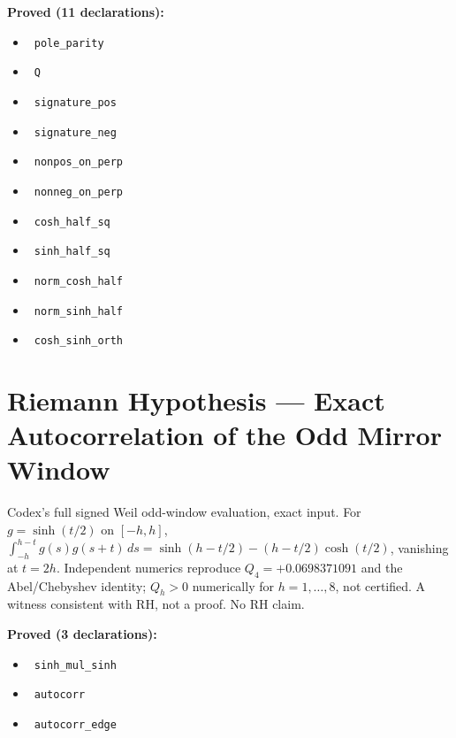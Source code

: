 \documentclass{report}
\theoremstyle{definition}
\begin{document}
\noindent\textbf{Proved (11 declarations):}
\begin{itemize}
  \item {}\leanok\ \texttt{pole\_parity}
  \item {}\leanok\ \texttt{Q}
  \item {}\leanok\ \texttt{signature\_pos}
  \item {}\leanok\ \texttt{signature\_neg}
  \item {}\leanok\ \texttt{nonpos\_on\_perp}
  \item {}\leanok\ \texttt{nonneg\_on\_perp}
  \item {}\leanok\ \texttt{cosh\_half\_sq}
  \item {}\leanok\ \texttt{sinh\_half\_sq}
  \item {}\leanok\ \texttt{norm\_cosh\_half}
  \item {}\leanok\ \texttt{norm\_sinh\_half}
  \item {}\leanok\ \texttt{cosh\_sinh\_orth}
\end{itemize}

\section{Riemann Hypothesis --- Exact Autocorrelation of the Odd Mirror Window}
Codex's full signed Weil odd-window evaluation, exact input. For $g=\sinh(t/2)$ on $[-h,h]$, $\int_{-h}^{h-t}g(s)g(s+t)\,ds=\sinh(h-t/2)-(h-t/2)\cosh(t/2)$, vanishing at $t=2h$. Independent numerics reproduce $Q_4=+0.0698371091$ and the Abel/Chebyshev identity; $Q_h>0$ numerically for $h=1,\dots,8$, not certified. A witness consistent with RH, not a proof. No RH claim.

\noindent\textbf{Proved (3 declarations):}
\begin{itemize}
  \item {}\leanok\ \texttt{sinh\_mul\_sinh}
  \item {}\leanok\ \texttt{autocorr}
  \item {}\leanok\ \texttt{autocorr\_edge}
\end{itemize}
\end{document}
